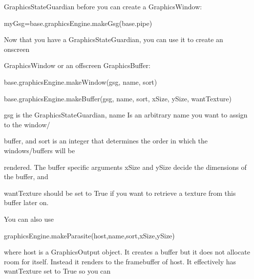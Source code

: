\documentclass[a4paper]{article}
\newcommand\textstyleOOoComputerIdent[1]{\textrm{\textcolor[rgb]{0.0,0.5019608,0.0}{#1}}}
\newcommand\textstyleOOoComputerBase[1]{\textrm{\textcolor{black}{#1}}}
\begin{document}
{\color{black}
GraphicsStateGuardian before you can create a GraphicsWindow:}


\bigskip

{\color{black}
\textstyleOOoComputerIdent{myGsg}\textstyleOOoComputerBase{=}\textstyleOOoComputerIdent{base}\textstyleOOoComputerBase{.}\textstyleOOoComputerIdent{graphicsEngine}\textstyleOOoComputerBase{.}\textstyleOOoComputerIdent{makeGsg}\textstyleOOoComputerBase{(}\textstyleOOoComputerIdent{base}\textstyleOOoComputerBase{.}\textstyleOOoComputerIdent{pipe}\textstyleOOoComputerBase{)}}


\bigskip

{\color{black}
Now that you have a GraphicsStateGuardian, you can use it to create an onscreen}

{\color{black}
GraphicsWindow or an offscreen GraphicsBuffer:}


\bigskip

{\ttfamily\color{black}
base.graphicsEngine.makeWindow(gsg, name, sort)}

{\ttfamily\color{black}
base.graphicsEngine.makeBuffer(gsg, name, sort, xSize, ySize, wantTexture)}


\bigskip

{\color{black}
gsg is the GraphicsStateGuardian, name Is an arbitrary name you want to assign to the window/}

{\color{black}
buffer, and sort is an integer that determines the order in which the windows/buffers will be}

{\color{black}
rendered. The buffer specific arguments xSize and ySize decide the dimensions of the buffer, and}

{\color{black}
wantTexture should be set to True if you want to retrieve a texture from this buffer later on.}

{\color{black}
You can also use}


\bigskip

{\ttfamily\color{black}
\textstyleOOoComputerIdent{graphicsEngine}\textstyleOOoComputerBase{.}\textstyleOOoComputerIdent{makeParasite}\textstyleOOoComputerBase{(}\textstyleOOoComputerIdent{host}\textstyleOOoComputerBase{,}\textstyleOOoComputerIdent{name}\textstyleOOoComputerBase{,}\textstyleOOoComputerIdent{sort}\textstyleOOoComputerBase{,}\textstyleOOoComputerIdent{xSize}\textstyleOOoComputerBase{,}\textstyleOOoComputerIdent{ySize}\textstyleOOoComputerBase{)}}


\bigskip

{\color{black}
where host is a GraphicsOutput object. It creates a buffer but it does not allocate room for itself. Instead it renders
to the framebuffer of host. It effectively has wantTexture set to True so you can}
\end{document}
